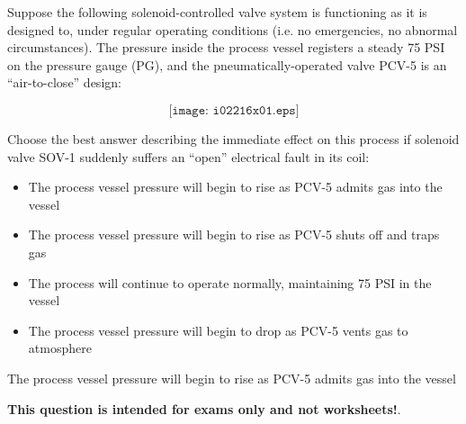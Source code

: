 

Suppose the following solenoid-controlled valve system is functioning as it is designed to, under regular operating conditions (i.e. no emergencies, no abnormal circumstances).  The pressure inside the process vessel registers a steady 75 PSI on the pressure gauge (PG), and the pneumatically-operated valve PCV-5 is an ``air-to-close'' design:

$$\texttt{[image: i02216x01.eps]}$$

\noindent
Choose the best answer describing the immediate effect on this process if solenoid valve SOV-1 suddenly suffers an ``open'' electrical fault in its coil:

\begin{itemize}
\item{} The process vessel pressure will begin to rise as PCV-5 admits gas into the vessel
\vskip 10pt
\item{} The process vessel pressure will begin to rise as PCV-5 shuts off and traps gas
\vskip 10pt
\item{} The process will continue to operate normally, maintaining 75 PSI in the vessel
\vskip 10pt
\item{} The process vessel pressure will begin to drop as PCV-5 vents gas to atmosphere
\end{itemize}







The process vessel pressure will begin to rise as PCV-5 admits gas into the vessel







{\bf This question is intended for exams only and not worksheets!}.




